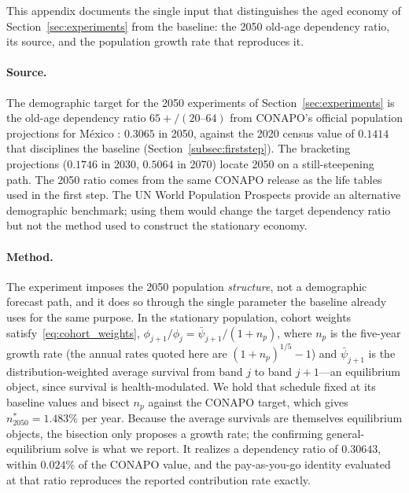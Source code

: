 \documentclass[12pt,a4paper]{article}
\begin{document}
\begin{appendices}
This appendix documents the single input that distinguishes the aged economy of Section~\ref{sec:experiments} from the baseline: the 2050 old-age dependency ratio, its source, and the population growth rate that reproduces it.

\paragraph{Source.} The demographic target for the 2050 experiments of Section~\ref{sec:experiments} is the old-age dependency ratio $65{+}/(20\text{--}64)$ from CONAPO's official population projections for M\'exico \citep[Proyecciones de la Poblaci\'on de M\'exico y de las Entidades Federativas, 2023 revision;][]{CONAPO2023}: $0.3065$ in 2050, against the 2020 census value of $0.1414$ that disciplines the baseline (Section~\ref{subsec:firststep}). The bracketing projections ($0.1746$ in 2030, $0.5064$ in 2070) locate 2050 on a still-steepening path. The 2050 ratio comes from the same CONAPO release as the life tables used in the first step. The UN World Population Prospects provide an alternative demographic benchmark; using them would change the target dependency ratio but not the method used to construct the stationary economy.

\paragraph{Method.} The experiment imposes the 2050 population \emph{structure}, not a demographic forecast path, and it does so through the single parameter the baseline already uses for the same purpose. In the stationary population, cohort weights satisfy~\eqref{eq:cohort_weights}, $\phi_{j+1}/\phi_j = \bar\psi_{j+1}/(1+n_p)$, where $n_p$ is the five-year growth rate (the annual rates quoted here are $(1+n_p)^{1/5}-1$) and $\bar\psi_{j+1}$ is the distribution-weighted average survival from band $j$ to band $j+1$---an equilibrium object, since survival is health-modulated. We hold that schedule fixed at its baseline values and bisect $n_p$ against the CONAPO target, which gives $n^{*}_{2050}=1.483\%$ per year. Because the average survivals are themselves equilibrium objects, the bisection only proposes a growth rate; the confirming general-equilibrium solve is what we report. It realizes a dependency ratio of $0.30643$, within $0.024\%$ of the CONAPO value, and the pay-as-you-go identity evaluated at that ratio reproduces the reported contribution rate exactly.


\end{appendices}
\end{document}
